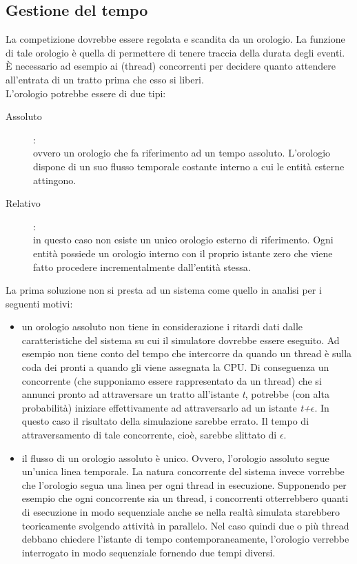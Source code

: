 \label{analisi_soluzioni}
\subsection{Gestione del tempo}
\label{tempo}
La competizione dovrebbe essere regolata e scandita da un orologio. La funzione
di tale orologio è quella di permettere
di tenere traccia della durata degli eventi. \`{E} necessario ad esempio ai
(thread) concorrenti per decidere quanto attendere all'entrata
di un tratto prima che esso si liberi.\\
L'orologio potrebbe essere di due tipi:
\begin{description}
\item[Assoluto]:\\
ovvero un orologio che fa riferimento ad un tempo assoluto. L'orologio dispone
di un suo flusso temporale costante 
interno a cui le entità esterne attingono.
\item[Relativo]:\\
in questo caso non esiste un unico orologio esterno di riferimento. Ogni entità
possiede un orologio interno con il proprio istante
zero che viene fatto procedere incrementalmente dall'entità stessa.
\end{description}
La prima soluzione non si presta ad un sistema come quello in analisi per i
seguenti motivi:
\begin{itemize}
\item un orologio assoluto non tiene in considerazione i ritardi dati dalle
caratteristiche del sistema su cui il simulatore dovrebbe
essere eseguito. Ad esempio non tiene conto del tempo che intercorre da quando
un thread è sulla coda dei pronti a quando gli viene assegnata la CPU.
Di conseguenza un concorrente (che supponiamo essere rappresentato da un thread)
che si annunci pronto ad attraversare un tratto all'istante
\emph{t}, potrebbe (con alta probabilità) iniziare effettivamente ad
attraversarlo ad un istante \emph{t+$\epsilon$}. In questo caso
il risultato della simulazione sarebbe errato. Il tempo di attraversamento di
tale concorrente, cioè, sarebbe slittato di $\epsilon$.
\item il flusso di un orologio assoluto è unico. Ovvero, l'orologio assoluto
segue un'unica linea temporale. La natura concorrente del sistema
invece vorrebbe che l'orologio segua una linea per ogni thread in esecuzione.
Supponendo per esempio che ogni concorrente sia un thread,
i concorrenti otterrebbero quanti di esecuzione in modo sequenziale anche se
nella realtà simulata starebbero teoricamente svolgendo
attività in parallelo. Nel caso quindi due o più thread debbano chiedere
l'istante di tempo contemporaneamente, 
l'orologio verrebbe interrogato in modo sequenziale fornendo due tempi diversi.
\end{itemize}
